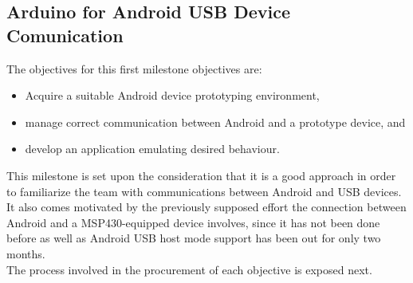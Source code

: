 		\subsection{Arduino for Android USB Device Comunication}
		\label{ssec:Arduino.USB}
			The objectives for this first milestone objectives are:
			\begin{itemize}
				\item Acquire a suitable Android device prototyping environment, 
				\item manage correct communication between Android and a prototype device, and
				\item develop an application emulating desired behaviour.
			\end{itemize}
			
			This milestone is set upon the consideration that it is a good approach in order to familiarize
			the team with communications between Android and USB devices. It also comes motivated by the
			previously supposed effort the connection between Android and a MSP430-equipped device involves,
			since it has not been done before as well as Android USB host mode support has been out for only
			two months.\\
	
			The process involved in the procurement of each objective is exposed next.
	
